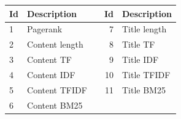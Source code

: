  
\begin{table}[h]
\centering
{}  \label{tab:setdescription} 
\begin{tabular}{lllrl}
\toprule
Id & Description &\qquad & Id & Description    \\ 
\midrule
1  & Pagerank  && 7  & Title length     \\
2  & Content length && 8  & Title TF  \\
3  & Content TF  && 9  & Title IDF   \\
4  & Content IDF && 10 & Title TFIDF   \\
5  & Content TFIDF && 11 & Title BM25  \\
6  & Content BM25   \\
\bottomrule
\end{tabular}
\end{table}




